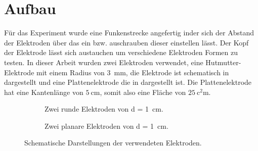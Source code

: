 \section{Aufbau}
\label{sec:setup}
Für das Experiment wurde eine Funkenstrecke angefertig inder sich der Abstand der Elektroden über das ein bzw. auschrauben dieser einstellen lässt. Der Kopf der Elektrode lässt sich austauchen um verschiedene Elektroden Formen zu testen. In dieser Arbeit wurden zwei Elektroden verwendet, eine Hutmutter-Elektrode mit einem Radius von \SI{3}{\milli\meter}, die Elektrode ist schematisch in  dargestellt und eine Plattenelektrode die in  dargestellt ist. Die Plattenelektrode hat eine Kantenlänge von \(\SI{5}{\centi\meter}\), somit also eine Fläche von \(\SI{25}{\square\centi\meter}\).

\begin{figure}[H]
    \centering
    \begin{subfigure}{0.45\textwidth}
        \centering
        
        \caption{Zwei runde Elektroden von d = \SI{1}{\centi\metre}.}
        \label{fig:setup_electrodes}
    \end{subfigure}
    \hfill
    \begin{subfigure}{0.45\textwidth}
        \centering
        
        \caption{Zwei planare Elektroden von d = \SI{1}{\centi\metre}.}
        \label{fig:setup_plate_electrodes}
    \end{subfigure}
    \caption{Schematische Darstellungen der verwendeten Elektroden.}
    \label{fig:setup_electrodes_combined}
\end{figure}
